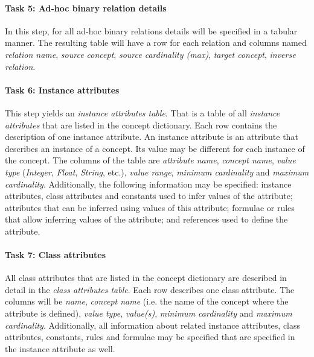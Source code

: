 
\paragraph{Task 5: Ad-hoc binary relation details}

In this step, for all ad-hoc binary relations details will be specified in a tabular manner. The resulting table will have a row for each relation and columns named \emph{relation name}, \emph{source concept}, \emph{source cardinality (max)}, \emph{target concept}, \emph{inverse relation}.


\paragraph{Task 6: Instance attributes}

This step yields an \emph{instance attributes table}. That is a table of all \emph{instance attributes} that are listed in the concept dictionary. Each row contains the description of one instance attribute. An instance attribute is an attribute that describes an instance of a concept. Its value may be different for each instance of the concept. The columns of the table are \emph{attribute name}, \emph{concept name}, \emph{value type} (\emph{Integer}, \emph{Float}, \emph{String}, etc.), \emph{value range}, \emph{minimum cardinality} and \emph{maximum cardinality}. Additionally, the following information may be specified: instance attributes, class attributes and constants used to infer values of the attribute; attributes that can be inferred using values of this attribute; formulae or rules that allow inferring values of the attribute; and references used to define the attribute.

\paragraph{Task 7: Class attributes}

All class attributes that are listed in the concept dictionary are described in detail in the \emph{class attributes table}. Each row describes one class attribute. The columns will be \emph{name}, \emph{concept name} (i.e. the name of the concept where the attribute is defined), \emph{value type}, \emph{value(s)}, \emph{minimum cardinality} and \emph{maximum cardinality}. Additionally, all information about related instance attributes, class attributes, constants, rules and formulae may be specified that are specified in the instance attribute as well.

